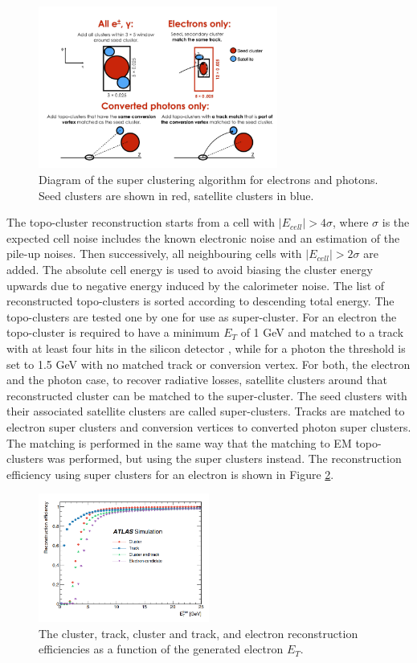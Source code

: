 \begin{figure}[H]
    \centering
    \includegraphics[width=0.7\textwidth]{Ch2/Img/Super_cluster.png}
    \caption{Diagram of the super clustering algorithm for electrons and photons. Seed clusters are shown in red, satellite clusters in blue.}
    \label{fig:chap2:Objetcs:Egamma:SC}
\end{figure}
The topo-cluster reconstruction starts from a cell with $|E_{cell}| > 4\sigma$, where $\sigma$ is the expected cell noise includes the known electronic noise and an estimation of the pile-up noises. Then successively, all neighbouring cells with $|E_{cell}| > 2\sigma$ are added. The absolute cell energy is used to avoid biasing the cluster energy upwards due to negative energy induced by the calorimeter noise. The list of reconstructed topo-clusters is sorted according to descending total energy. The topo-clusters are tested one by one for use as super-cluster. For an electron the topo-cluster is required to have a minimum $E_T$ of 1 GeV and matched to a track with at least four hits in the silicon detector \cite{GSF}, while for a photon the threshold is set to 1.5 GeV with no matched track or conversion vertex. For both, the electron and the photon case, to recover radiative losses, satellite clusters around that reconstructed cluster can be matched to the super-cluster. The seed clusters with their associated satellite clusters are called super-clusters. Tracks are matched to electron super clusters and conversion vertices to converted photon super clusters. The matching is performed in the same way that the matching to EM topo-clusters was performed, but using the super clusters instead. The reconstruction efficiency using super clusters for an electron is shown in Figure \ref{fig:chap2:Objects:Egamma:El_Eff}.
\begin{figure}[H]
    \centering
    \includegraphics[width=0.5\textwidth]{Ch2/Img/Electron_Reco_Eff.png}
    \caption{The cluster, track, cluster and track, and electron reconstruction efficiencies as a function of the generated electron $E_T$.}
    \label{fig:chap2:Objects:Egamma:El_Eff}
\end{figure}
